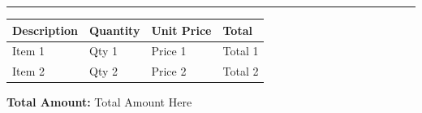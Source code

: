 \documentclass[12pt,a4paper]{article}
\begin{document}
\rule{\textwidth}{1pt}

\vspace{0.5cm}

\begin{minipage}[t]{0.93\textwidth}
    \begin{tabularx}{\textwidth}{|X|X|X|X|}
        \hline
        Description & Quantity & Unit Price & Total   \\
        \hline
        Item 1      & Qty 1    & Price 1    & Total 1 \\
        Item 2      & Qty 2    & Price 2    & Total 2 \\
        \hline
    \end{tabularx}
\end{minipage}


\begin{flushright}
    \textbf{Total Amount: } Total Amount Here \\
\end{flushright}
\end{document}
